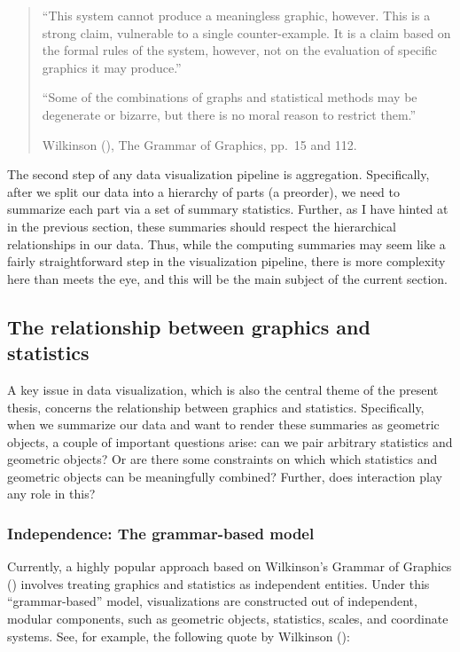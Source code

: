 \documentclass[
  openany]{book}
\theoremstyle{definition}
\theoremstyle{definition}
\theoremstyle{definition}
\theoremstyle{definition}
\theoremstyle{remark}
\begin{document}
\begin{quote}
``This system cannot produce a meaningless graphic, however. This is a strong claim, vulnerable to a single counter-example. It is a claim based on the formal rules of the system, however, not on the evaluation of specific graphics it may produce.''

``Some of the combinations of graphs and statistical methods may be degenerate or bizarre, but there is no moral reason to restrict them.''

Wilkinson (), The Grammar of Graphics, pp.~15 and 112.
\end{quote}

The second step of any data visualization pipeline is aggregation. Specifically, after we split our data into a hierarchy of parts (a preorder), we need to summarize each part via a set of summary statistics. Further, as I have hinted at in the previous section, these summaries should respect the hierarchical relationships in our data. Thus, while the computing summaries may seem like a fairly straightforward step in the visualization pipeline, there is more complexity here than meets the eye, and this will be the main subject of the current section.

\subsection{The relationship between graphics and statistics}\label{the-relationship-between-graphics-and-statistics}

A key issue in data visualization, which is also the central theme of the present thesis, concerns the relationship between graphics and statistics. Specifically, when we summarize our data and want to render these summaries as geometric objects, a couple of important questions arise: can we pair arbitrary statistics and geometric objects? Or are there some constraints on which which statistics and geometric objects can be meaningfully combined? Further, does interaction play any role in this?

\subsubsection{Independence: The grammar-based model}\label{independence-the-grammar-based-model}

Currently, a highly popular approach based on Wilkinson's Grammar of Graphics () involves treating graphics and statistics as independent entities. Under this ``grammar-based'' model, visualizations are constructed out of independent, modular components, such as geometric objects, statistics, scales, and coordinate systems. See, for example, the following quote by Wilkinson ():
\end{document}
